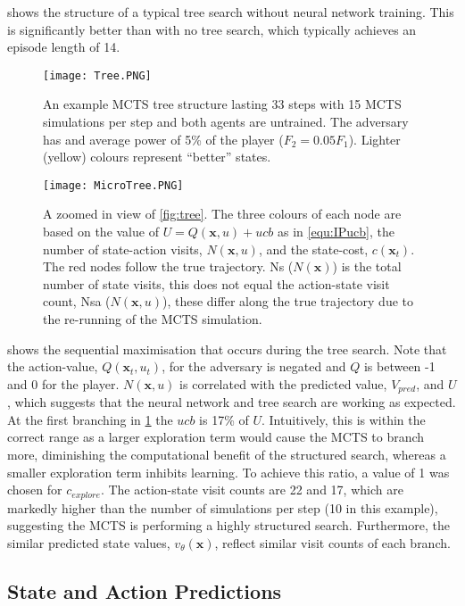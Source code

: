 \documentclass[../main.tex]{subfiles}
\begin{document}
 shows the structure of a typical tree search without neural network training. This is significantly better than with no tree search, which typically achieves an episode length of 14.

\begin{figure}[H]
    \centering
    \texttt{[image: Tree.PNG]}
    \caption{An example MCTS tree structure lasting 33 steps with 15 MCTS simulations per step and both agents are untrained. The adversary has and average power of 5\% of the player ($F_2 = 0.05F_1$). Lighter (yellow) colours represent ``better'' states.}
    \label{fig:tree}
    \vspace{0.7cm}
    \centering
    \texttt{[image: MicroTree.PNG]}
    \caption{A zoomed in view of \cref{fig:tree}. The three colours of each node are based on the value of $U=Q(\boldsymbol{x}, u) + ucb$ as in \cref{equ:IPucb}, the number of state-action visits, $N(\boldsymbol{x}, u)$, and the state-cost, $c(\boldsymbol{x}_t)$. The red nodes follow the true trajectory. Ns ($N(\boldsymbol{x})$) is the total number of state visits, this does not equal the action-state visit count, Nsa ($N(\boldsymbol{x}, u)$), these differ along the true trajectory due to the re-running of the MCTS simulation.}
    \label{fig:microtree}
\end{figure}

 shows the sequential maximisation that occurs during the tree search. Note that the action-value, $Q(\boldsymbol{x}_t, u_t)$, for the adversary is negated and $Q$ is between -1 and 0 for the player. $N(\boldsymbol{x}, u)$ is correlated with the predicted value, $V_{pred}$, and $U$, which suggests that the neural network and tree search are working as expected. At the first branching in \cref{fig:microtree} the $ucb$ is 17\% of $U$. Intuitively, this is within the correct range as a larger exploration term would cause the MCTS to branch more, diminishing the computational benefit of the structured search, whereas a smaller exploration term inhibits learning. To achieve this ratio, a value of 1 was chosen for $c_{explore}$. The action-state visit counts are 22 and 17, which are markedly higher than the number of simulations per step (10 in this example), suggesting the MCTS is performing a highly structured search. Furthermore, the similar predicted state values, $v_\theta(\boldsymbol{x})$, reflect similar visit counts of each branch.

\subsection{State and Action Predictions}
\end{document}
